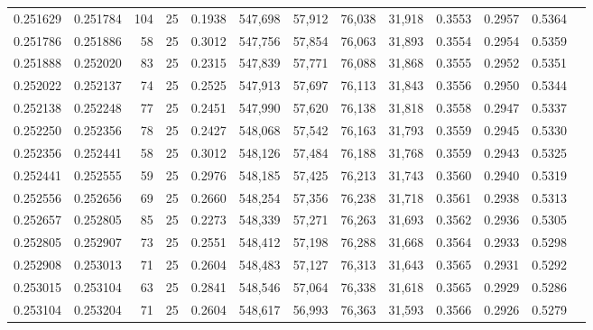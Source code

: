 \begin{tabular}{rrrrrrrrrrrrr}
0.251629 & 0.251784 &   104 &  25 &                                     0.1938 & 547,698 &  57,912 &  76,038 &  31,918 & 0.3553 & 0.2957 & 0.5364 \\
0.251786 & 0.251886 &    58 &  25 &                                     0.3012 & 547,756 &  57,854 &  76,063 &  31,893 & 0.3554 & 0.2954 & 0.5359 \\
0.251888 & 0.252020 &    83 &  25 &                                     0.2315 & 547,839 &  57,771 &  76,088 &  31,868 & 0.3555 & 0.2952 & 0.5351 \\
0.252022 & 0.252137 &    74 &  25 &                                     0.2525 & 547,913 &  57,697 &  76,113 &  31,843 & 0.3556 & 0.2950 & 0.5344 \\
0.252138 & 0.252248 &    77 &  25 &                                     0.2451 & 547,990 &  57,620 &  76,138 &  31,818 & 0.3558 & 0.2947 & 0.5337 \\
0.252250 & 0.252356 &    78 &  25 &                                     0.2427 & 548,068 &  57,542 &  76,163 &  31,793 & 0.3559 & 0.2945 & 0.5330 \\
0.252356 & 0.252441 &    58 &  25 &                                     0.3012 & 548,126 &  57,484 &  76,188 &  31,768 & 0.3559 & 0.2943 & 0.5325 \\
0.252441 & 0.252555 &    59 &  25 &                                     0.2976 & 548,185 &  57,425 &  76,213 &  31,743 & 0.3560 & 0.2940 & 0.5319 \\
0.252556 & 0.252656 &    69 &  25 &                                     0.2660 & 548,254 &  57,356 &  76,238 &  31,718 & 0.3561 & 0.2938 & 0.5313 \\
0.252657 & 0.252805 &    85 &  25 &                                     0.2273 & 548,339 &  57,271 &  76,263 &  31,693 & 0.3562 & 0.2936 & 0.5305 \\
0.252805 & 0.252907 &    73 &  25 &                                     0.2551 & 548,412 &  57,198 &  76,288 &  31,668 & 0.3564 & 0.2933 & 0.5298 \\
0.252908 & 0.253013 &    71 &  25 &                                     0.2604 & 548,483 &  57,127 &  76,313 &  31,643 & 0.3565 & 0.2931 & 0.5292 \\
0.253015 & 0.253104 &    63 &  25 &                                     0.2841 & 548,546 &  57,064 &  76,338 &  31,618 & 0.3565 & 0.2929 & 0.5286 \\
0.253104 & 0.253204 &    71 &  25 &                                     0.2604 & 548,617 &  56,993 &  76,363 &  31,593 & 0.3566 & 0.2926 & 0.5279 \\

\end{tabular}
